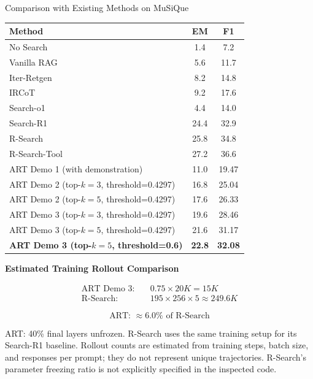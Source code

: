 \begin{frame}{Comparison with Existing Methods on MuSiQue}

\centering
\tiny

\begin{tabular}{lcc}
    \hline
    \textbf{Method} & \textbf{EM} & \textbf{F1} \\
    \hline
    No Search & 1.4 & 7.2 \\
    Vanilla RAG & 5.6 & 11.7 \\
    Iter-Retgen & 8.2 & 14.8 \\
    IRCoT & 9.2 & 17.6 \\
    Search-o1 & 4.4 & 14.0 \\
    Search-R1 & 24.4 & 32.9 \\
    R-Search & 25.8 & 34.8 \\
    R-Search-Tool & 27.2 & 36.6 \\
    \hline
    ART Demo 1 (with demonstration) & 11.0 & 19.47 \\
    ART Demo 2 (top-$k=3$, threshold=0.4297) & 16.8 & 25.04 \\
    ART Demo 2 (top-$k=5$, threshold=0.4297) & 17.6 & 26.33 \\
    ART Demo 3 (top-$k=3$, threshold=0.4297) & 19.6 & 28.46 \\
    ART Demo 3 (top-$k=5$, threshold=0.4297) & 21.6 & 31.17 \\
    \textbf{ART Demo 3 (top-$k=5$, threshold=0.6)}
        & \textbf{22.8} & \textbf{32.08} \\
    \hline
\end{tabular}

\vspace{0.12cm}

\textbf{Estimated Training Rollout Comparison}

\[
\begin{aligned}
\text{ART Demo 3:}\quad
&0.75 \times 20K = 15K \\
\text{R-Search:}\quad
&195 \times 256 \times 5 \approx 249.6K
\end{aligned}
\]

\[
\boxed{
\text{ART: } \approx 6.0\% \text{ of R-Search}
}
\]

\raggedright
\tiny
ART: 40\% final layers unfrozen. R-Search uses the same
training setup for its Search-R1 baseline. Rollout counts are
estimated from training steps, batch size, and responses per prompt;
they do not represent unique trajectories. R-Search's parameter
freezing ratio is not explicitly specified in the inspected code.

\end{frame}

